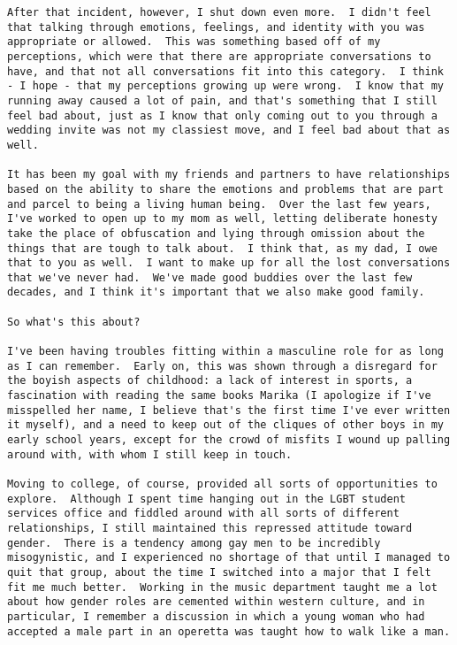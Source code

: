 \begin{paracol}{2}
\begin{leftcolumn}
\begin{verbatim}
After that incident, however, I shut down even more.  I didn't feel that talking through emotions, feelings, and identity with you was appropriate or allowed.  This was something based off of my perceptions, which were that there are appropriate conversations to have, and that not all conversations fit into this category.  I think - I hope - that my perceptions growing up were wrong.  I know that my running away caused a lot of pain, and that's something that I still feel bad about, just as I know that only coming out to you through a wedding invite was not my classiest move, and I feel bad about that as well.

It has been my goal with my friends and partners to have relationships based on the ability to share the emotions and problems that are part and parcel to being a living human being.  Over the last few years, I've worked to open up to my mom as well, letting deliberate honesty take the place of obfuscation and lying through omission about the things that are tough to talk about.  I think that, as my dad, I owe that to you as well.  I want to make up for all the lost conversations that we've never had.  We've made good buddies over the last few decades, and I think it's important that we also make good family.

So what's this about?

I've been having troubles fitting within a masculine role for as long as I can remember.  Early on, this was shown through a disregard for the boyish aspects of childhood: a lack of interest in sports, a fascination with reading the same books Marika (I apologize if I've misspelled her name, I believe that's the first time I've ever written it myself), and a need to keep out of the cliques of other boys in my early school years, except for the crowd of misfits I wound up palling around with, with whom I still keep in touch.

Moving to college, of course, provided all sorts of opportunities to explore.  Although I spent time hanging out in the LGBT student services office and fiddled around with all sorts of different relationships, I still maintained this repressed attitude toward gender.  There is a tendency among gay men to be incredibly misogynistic, and I experienced no shortage of that until I managed to quit that group, about the time I switched into a major that I felt fit me much better.  Working in the music department taught me a lot about how gender roles are cemented within western culture, and in particular, I remember a discussion in which a young woman who had accepted a male part in an operetta was taught how to walk like a man.


\end{verbatim}
\end{leftcolumn}
\end{paracol}
